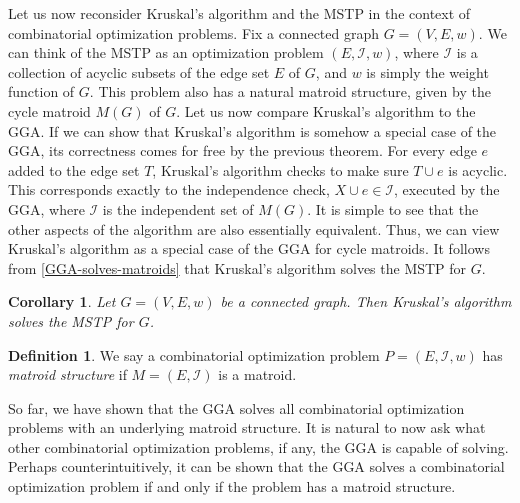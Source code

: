 \documentclass[a4paper,11pt]{report}
\theoremstyle{plain}
\newtheorem{cor}[cor]{Corollary}
\theoremstyle{definition}
\newtheorem{defn}[defn]{Definition}
\newcommand{\I}{\mathcal{I}}
\begin{document}

Let us now reconsider Kruskal's algorithm and the MSTP in the context of
combinatorial optimization problems. Fix a connected graph $G = (V,E,w)$. We
can think of the MSTP as an optimization problem $(E,\I,w)$, where $\I$ is a
collection of acyclic subsets of the edge set $E$ of $G$, and $w$ is simply the
weight function of $G$. This problem also has a natural matroid structure,
given by the cycle matroid $M(G)$ of $G$. Let us now compare Kruskal's
algorithm to the GGA. If we can show that Kruskal's algorithm is somehow a
special case of the GGA, its correctness comes for free by the previous
theorem. For every edge $e$ added to the edge set $T$, Kruskal's algorithm
checks to make sure $T \cup e$ is acyclic. This corresponds exactly to the
independence check, $X \cup e \in \I$, executed by the GGA, where $\I$ is the
independent set of $M(G)$. It is simple to see that the other aspects of the
algorithm are also essentially equivalent. Thus, we can view Kruskal's
algorithm as a special case of the GGA for cycle matroids. It follows from
\autoref{GGA-solves-matroids} that Kruskal's algorithm solves the MSTP for $G$.

\begin{cor}\label{kruskal-solves-MSTP}
Let $G = (V,E,w)$ be a connected graph. Then Kruskal's algorithm solves the
MSTP for $G$.
\end{cor}

\begin{defn}
We say a combinatorial optimization problem $P = (E,\I,w)$ has \emph{matroid structure}
if $M = (E, \I)$ is a matroid.
\end{defn}

So far, we have shown that the GGA solves all combinatorial optimization
problems with an underlying matroid structure. It is natural to now ask what
other combinatorial optimization problems, if any, the GGA is capable of
solving. Perhaps counterintuitively, it can be shown that the GGA solves a
combinatorial optimization problem if and only if the problem has a matroid
structure.
\end{document}
